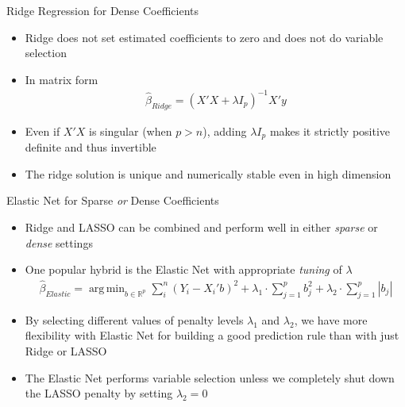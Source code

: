 \documentclass[aspectratio=1610,12pt,xcolor=dvipsnames]{beamer}
\DeclareMathOperator*{\argmin}{arg\,min}
\begin{document}
\begin{frame}{Ridge Regression for Dense Coefficients}

\begin{itemize}
    \item Ridge does not set estimated coefficients to zero and does not do variable selection
    \item In matrix form
    \begin{align*}
        \hat \beta_{Ridge} = (X'X + \lambda I_p)^{-1}X'y
    \end{align*}
    \item Even if $X'X$ is singular (when $p>n$), adding $\lambda I_p$ makes it strictly positive definite and thus invertible
    \item The ridge solution is unique and numerically stable even in high dimension
\end{itemize}
\end{frame}

\begin{frame}{Elastic Net for Sparse \textit{or} Dense Coefficients}

\begin{itemize}
    \item Ridge and LASSO can be combined and perform well in either \textit{sparse} or \textit{dense} settings
    \item One popular hybrid is the Elastic Net with appropriate \textit{tuning} of $\lambda$
    \begin{align*}
        \hat \beta_{Elastic} = \argmin_{b\in\mathbb{R}^{p}}\sum_i^n(Y_i - X_i'b)^2 + \lambda_1 \cdot \sum_{j=1}^{p}b_j^2 + \lambda_2 \cdot \sum_{j=1}^{p}|b_j| 
    \end{align*}
    \item By selecting different values of penalty levels $\lambda_1$ and $\lambda_2$, we have more flexibility with Elastic Net for building a good prediction rule than with just Ridge or LASSO
    \item The Elastic Net performs variable selection unless we completely shut down the LASSO penalty by setting $\lambda_2=0$
\end{itemize}
\end{frame}
\end{document}
